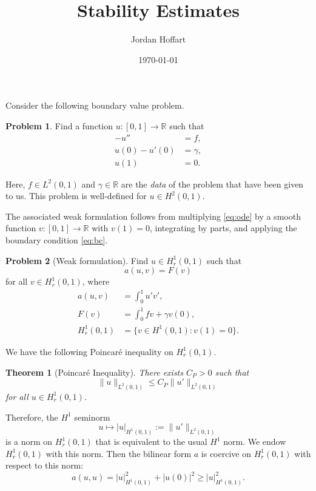 \documentclass{article}
\title{Stability Estimates}
\author{Jordan Hoffart}
\date{\today}
\theoremstyle{plain}
\newtheorem{theorem}{Theorem}
\theoremstyle{definition}
\newtheorem{problem}{Problem}
\begin{document}
\maketitle

Consider the following boundary value problem.
\begin{problem}
  Find a function $u : [0,1] \to \mathbb R$ such that
  \begin{align}
    \label{eq:ode} -u'' & = f, \\
    \label{eq:bc} u(0) - u'(0) & = \gamma, \\
    u(1) & = 0.
  \end{align}
\end{problem}
Here, $f \in L^2(0,1)$ and $\gamma \in \mathbb R$ are the \emph{data} of the problem that have been given to us.
This problem is well-defined for $u \in H^2(0,1)$.

The associated weak formulation follows from multiplying \eqref{eq:ode} by a smooth function $v : [0,1] \to \mathbb R$ with $v(1) = 0$, integrating by parts, and applying the boundary condition \eqref{eq:bc}.
\begin{problem}[Weak formulation]\label{prob:weak}
  Find $u \in H_r^1(0,1)$ such that
  \begin{equation}
    a(u,v) = F(v)
  \end{equation}
  for all $v \in H_r^1(0,1)$, where
  \begin{align}
    a(u,v) & = \int_0^1u'v', \\
    F(v) &= \int_0^1fv + \gamma v(0), \\
    H^1_r(0,1) & = \{ v \in H^1(0,1) : v(1) = 0 \}.
  \end{align}
\end{problem}

We have the following Poincar\'e inequality on $H^1_r(0,1)$.
\begin{theorem}[Poincar\'e Inequality]
  There exists $C_P > 0$ such that
  \begin{equation}
    \|u\|_{L^2(0,1)} \leq C_P \|u'\|_{L^2(0,1)}
  \end{equation}
  for all $u \in H^1_r(0,1)$.
\end{theorem}
Therefore, the $H^1$ seminorm \[u \mapsto |u|_{H^1(0,1)} := \|u'\|_{L^2(0,1)} \] is a norm on $H^1_r(0,1)$ that is equivalent to the usual $H^1$ norm.
We endow $H^1_r(0,1)$ with this norm.
Then the bilinear form $a$ is coercive on $H^1_r(0,1)$ with respect to this norm:
\begin{equation}\label{eq:coercive}
  a(u,u) = |u|_{H^1(0,1)}^2 + |u(0)|^2 \geq |u|_{H^1(0,1)}^2.
\end{equation}
\end{document}
